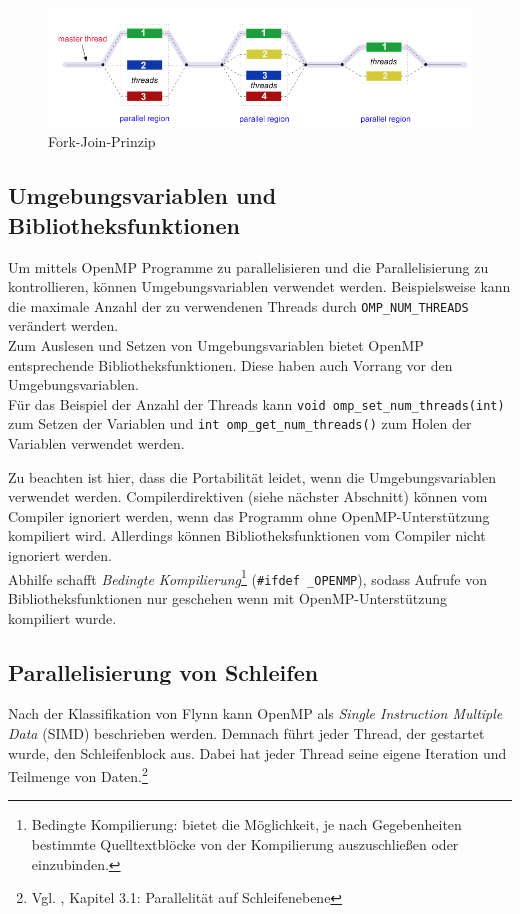 \documentclass[11pt]{scrartcl}
\begin{document}
\begin{figure}[h!]	
\centering
\includegraphics[width=1.0\textwidth]{img/fork_join.png}
\caption{Fork-Join-Prinzip}
\label{join_fork_model}
\end{figure} 

\subsection{Umgebungsvariablen und Bibliotheksfunktionen}

Um mittels OpenMP Programme zu parallelisieren und die Parallelisierung zu kontrollieren, können Umgebungsvariablen verwendet werden. Beispielsweise kann die maximale Anzahl der zu verwendenen Threads durch \texttt{OMP\_NUM\_THREADS} verändert werden.\\ 
Zum Auslesen und Setzen von Umgebungsvariablen bietet OpenMP entsprechende Bibliotheksfunktionen. Diese haben auch Vorrang vor den Umgebungsvariablen.\\
Für das Beispiel der Anzahl der Threads kann \texttt{void omp\_set\_num\_threads(int)} zum Setzen der Variablen und \texttt{int omp\_get\_num\_threads()} zum Holen der Variablen verwendet werden.

Zu beachten ist hier, dass die Portabilität leidet, wenn die Umgebungsvariablen verwendet werden. Compilerdirektiven (siehe nächster Abschnitt) können vom Compiler ignoriert werden, wenn das Programm ohne OpenMP-Unterstützung kompiliert wird. Allerdings können Bibliotheksfunktionen vom Compiler nicht ignoriert werden. \\
Abhilfe schafft \textit{Bedingte Kompilierung}\footnote{Bedingte Kompilierung: bietet die Möglichkeit, je nach Gegebenheiten bestimmte Quelltextblöcke von der Kompilierung auszuschließen oder einzubinden. } (\texttt{\#ifdef \_OPENMP}), sodass Aufrufe von Bibliotheksfunktionen nur geschehen wenn mit OpenMP-Unterstützung kompiliert wurde. 

\subsection{Parallelisierung von Schleifen} 
Nach der Klassifikation von Flynn kann OpenMP als \emph{Single Instruction Multiple Data} (SIMD) beschrieben werden. Demnach führt jeder Thread, der gestartet wurde, den Schleifenblock aus. Dabei hat jeder Thread seine eigene Iteration und Teilmenge von Daten.\footnote{Vgl. \cite{openmp08}, Kapitel 3.1: Parallelität auf Schleifenebene}
\end{document}
